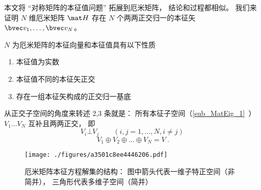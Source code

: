 
\begin{issues}
\issueDraft
\end{issues}


本文将 “对称矩阵的本征值问题” 拓展到厄米矩阵， 结论和过程都相似。 我们来证明 $N$ 维厄米矩阵 $\mat H$ 存在 $N$ 个两两正交归一的本征矢 $\bvec v_1, \dots, \bvec v_N$。


\begin{theorem}{}
$N$ 为厄米矩阵的本征向量和本征值具有以下性质
\begin{enumerate}
\item 本征值为实数
\item 本征值不同的本征矢正交
\item 存在一组本征矢构成的正交归一基底
\end{enumerate}
\end{theorem}

从正交子空间的角度来转述 2,3 条就是： 所有本征子空间（\autoref{sub_MatEig_1}~） $V_1 \dots V_N$ 互补且两两正交， 即
\begin{equation}
V_i\bot V_j \qquad (i, j = 1,\dots, N, i \ne j)~
\end{equation}
\begin{equation}
V_1\oplus V_2 \oplus\dots \oplus V_N = V~.
\end{equation}


\begin{figure}[ht]
\centering
\texttt{[image: ./figures/a3501c8ee4446206.pdf]}
\caption{厄米矩阵本征方程解集的结构： 图中箭头代表一维子特正空间（非简并）， 三角形代表多维子空间（简并）} \label{fig_HerEig_1}
\end{figure}

